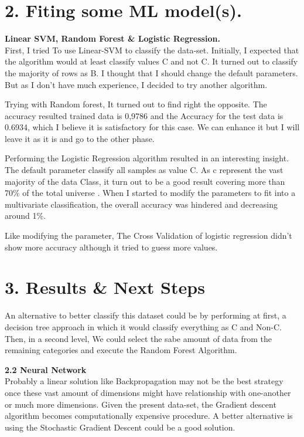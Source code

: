 \documentclass[11pt,pressrelease]{newlfm} %
\begin{document}
\begin{newlfm}
\begin{singlespace}
\hfill \break
\section{2. Fiting some ML model(s).}

\large\textbf{Linear SVM, Random Forest \& Logistic Regression.} \\

First, I tried To use Linear-SVM to classify the data-set. Initially, I expected that the algorithm would at least classify values C and not C. It turned out to classify the majority of rows as B. I thought that I should change the default parameters. But as I don't have much experience, I decided to try another algorithm.

Trying with Random forest, It turned out to find right the opposite. The accuracy resulted trained data is 0,9786 and the Accuracy for the test data is 0.6934, which I believe it is satisfactory for this case. We can enhance it but I will leave it as it is and go to the other phase.

Performing the Logistic Regression algorithm resulted in an interesting insight. The default parameter classify all samples as value C. As c represent the vast majority of the data Class, it turn out to be a good result covering more than 70\% of the total universe . When I started to modify the parameters to fit into a multivariate classification, the overall accuracy was hindered and decreasing around 1\%.

Like modifying the parameter, The Cross Validation of logistic regression didn't show more accuracy although it tried to guess more values.

\hfill \break
\section{3. Results \& Next Steps}

An alternative to better classify this dataset could be by performing at first, a decision tree approach in which it would classify everything as C and Non-C. Then, in a second level, We could select the sabe amount of data from the remaining categories and execute the Random Forest Algorithm.


\large\textbf{2.2 Neural Network} \\
Probably a linear solution like Backpropagation may not be the best strategy  once these vast amount of dimensions might have relationship with one-another or much more dimensions.  Given the present data-set, the Gradient descent algorithm becomes computationally expensive procedure. A better alternative is using the Stochastic Gradient Descent could be a good solution.


\end{singlespace} %


\end{newlfm}
\end{document}
